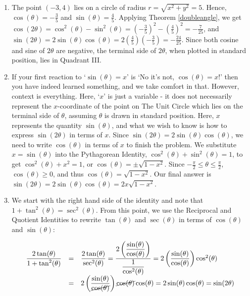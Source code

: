 {\begin{enumerate}

\item  The point $(-3,4)$ lies on a circle of radius $r = \sqrt{x^2+y^2} = 5$.  Hence, $\cos(\theta) = -\frac{3}{5}$ and $\sin(\theta) = \frac{4}{5}$.  Applying Theorem \ref{doubleangle}, we get $\cos(2\theta) = \cos^{2}(\theta) - \sin^{2}(\theta) = \left(-\frac{3}{5}\right)^2 - \left(\frac{4}{5}\right)^2 = -\frac{7}{25}$, and $\sin(2\theta) = 2 \sin(\theta) \cos(\theta) = 2 \left(\frac{4}{5}\right)\left(-\frac{3}{5}\right) = -\frac{24}{25}$.  Since both cosine and sine of $2\theta$ are negative, the terminal side of $2\theta$, when plotted in standard position, lies in Quadrant III.


\item  If your first reaction to `$\sin(\theta) = x$' is `No it's not, $\cos(\theta) = x$!' then you have indeed learned something, and we take comfort in that. However, context is everything.  Here, `$x$' is just a variable - it does not necessarily represent the $x$-coordinate of the point on The Unit Circle which lies on the terminal side of $\theta$, assuming $\theta$ is drawn in standard position.  Here, $x$ represents the quantity $\sin(\theta)$, and what we wish to know is how to express $\sin(2\theta)$ in terms of $x$.    Since $\sin(2\theta) = 2 \sin(\theta) \cos(\theta)$, we need to write $\cos(\theta)$ in terms of $x$ to finish the problem.  We substitute $x = \sin(\theta)$ into the Pythagorean Identity, $\cos^{2}(\theta) + \sin^{2}(\theta) = 1$, to get $\cos^{2}(\theta) + x^2 = 1$, or $\cos(\theta) = \pm \sqrt{1-x^2}$.  Since  $-\frac{\pi}{2} \leq \theta \leq \frac{\pi}{2}$, $\cos(\theta) \geq 0$, and thus $\cos(\theta) = \sqrt{1-x^2}$.  Our final answer is  $\sin(2\theta) = 2 \sin(\theta) \cos(\theta) = 2x\sqrt{1-x^2}$.

\item  We start with the right hand side of the identity and note that $1 + \tan^{2}(\theta) = \sec^{2}(\theta)$.  From this point, we use the Reciprocal and Quotient Identities to rewrite $\tan(\theta)$ and $\sec(\theta)$ in terms of $\cos(\theta)$ and $\sin(\theta)$:


\[ \begin{array}{rcl}

\dfrac{2\tan(\theta)}{1 + \tan^{2}(\theta)} & = & \dfrac{2\tan(\theta)}{\sec^{2}(\theta)}= \dfrac{2 \left( \dfrac{\sin(\theta)}{\cos(\theta)}\right)}{\dfrac{1}{\cos^{2}(\theta)}}= 2\left( \dfrac{\sin(\theta)}{\cos(\theta)}\right) \cos^{2}(\theta) \\ [15pt]
																						& = & 2\left( \dfrac{\sin(\theta)}{\cancel{\cos(\theta)}}\right) \cancel{\cos(\theta)} \cos(\theta) = 2\sin(\theta) \cos(\theta) = \sin(2\theta) \\ 


\end{array}\]
\end{enumerate}}

